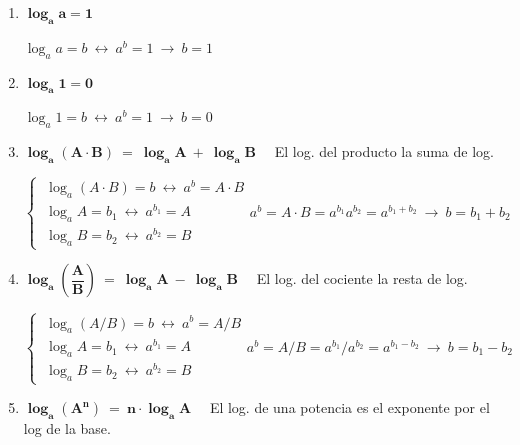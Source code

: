 \vspace{5mm}

\begin{theorem}
	
	\begin{enumerate}[P1. ]
	\item $\boldsymbol{ \log_aa=1}$
	
	\textcolor{gris}{$\log_aa=b \ \leftrightarrow \ a^b=1 \ \to \ b=1$ \QED} 	
	
	\item $\boldsymbol{\log_a1=0}$
	
	\textcolor{gris}{$\log_a1=b \ \leftrightarrow \ a^b=1 \ \to \ b=0$ \QED} 	
	
	\item $\boldsymbol{\log_a (A\cdot B)\ = \ \log_aA\ + \ \log_aB }\quad $ El log. del producto la suma de log.

\color{gris}
	\small{	
	$\begin{cases}
	\ \log_a(A\cdot B)=b \ \leftrightarrow \ a^b=A\cdot B \\
	\ \log_aA=b_1 \ \leftrightarrow \ a^{b_1}=A	\\
	\ \log_aB=b_2 \ \leftrightarrow \ a^{b_2}=B
	\end{cases}
	a^b=A\cdot B=a^{b_1}a^{b_2}=a^{b_1+b_2} \ \to \ b=b_1+b_2 $ \QED }	
	\color{black} 
	
	\item $\boldsymbol{\log_a \left(\dfrac A B \right)\ = \ \log_aA\ - \ \log_aB }\quad $ El log. del cociente la resta de log\normalsize{.}
	
	\color{gris}
	\small{	
	$\begin{cases}
	\ \log_a(A/ B)=b \ \leftrightarrow \ a^b=A/B \\
	\ \log_aA=b_1 \ \leftrightarrow \ a^{b_1}=A	\\
	\ \log_aB=b_2 \ \leftrightarrow \ a^{b_2}=B
	\end{cases}
	a^b=A/ B=a^{b_1}/a^{b_2}=a^{b_1-b_2} \ \to \ b=b_1-b_2 $ \QED }	
	\color{black} 
	
	\item $\boldsymbol{\log_a (A^n)\ = \ n\cdot \log_aA} \quad $ \small{El log. de una potencia es el exponente por el log de la base}\normalsize{.}
	
	\color{black} 

\end{enumerate}

\end{theorem}

